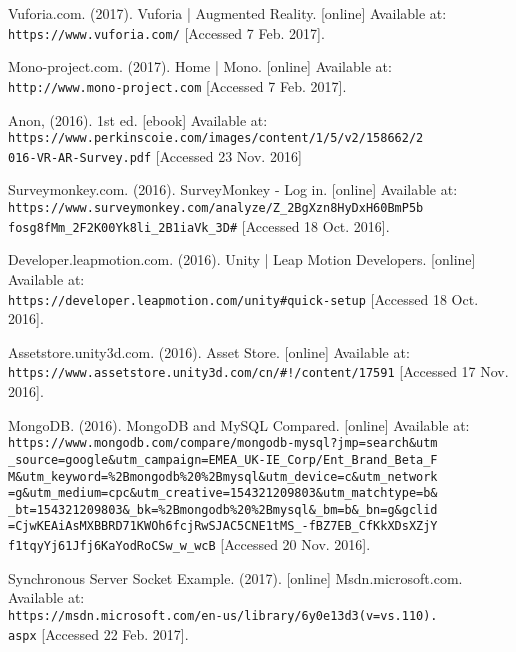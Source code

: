 \begin{thebibliography}{}
Vuforia.com. (2017). Vuforia | Augmented Reality. [online] Available at: 
\\\texttt{https://www.vuforia.com/} [Accessed 7 Feb. 2017].

Mono-project.com. (2017). Home | Mono. [online] Available at:
\\\texttt{http://www.mono-project.com} [Accessed 7 Feb. 2017].


Anon, (2016). 1st ed. [ebook] Available at:
\\\texttt{https://www.perkinscoie.com/images/content/1/5/v2/158662/2\\016-VR-AR-Survey.pdf}
[Accessed 23 Nov. 2016]

Surveymonkey.com. (2016). SurveyMonkey - Log in. [online] Available at:
\\\texttt{https://www.surveymonkey.com/analyze/Z\_2BgXzn8HyDxH60BmP5b\\fosg8fMm\_2F2K00Yk8li\_2B1iaVk\_3D\#}
[Accessed 18 Oct. 2016].

Developer.leapmotion.com. (2016). Unity | Leap Motion Developers. [online] Available at:
\\\texttt{https://developer.leapmotion.com/unity\#quick-setup}
[Accessed 18 Oct. 2016].

Assetstore.unity3d.com. (2016). Asset Store. [online] Available at:
\\\texttt{https://www.assetstore.unity3d.com/cn/\#!/content/17591}
[Accessed 17 Nov. 2016].

MongoDB. (2016). MongoDB and MySQL Compared. [online] Available at:
\\\texttt{https://www.mongodb.com/compare/mongodb-mysql?jmp=search\&utm\\\_source=google\&utm\_campaign=EMEA\_UK-IE\_Corp/Ent\_Brand\_Beta\_F\\M\&utm\_keyword=\%2Bmongodb\%20\%2Bmysql\&utm\_device=c\&utm\_network\\=g\&utm\_medium=cpc\&utm\_creative=154321209803\&utm\_matchtype=b\&\\\_bt=154321209803\&\_bk=\%2Bmongodb\%20\%2Bmysql\&\_bm=b\&\_bn=g\&gclid\\=CjwKEAiAsMXBBRD71KWOh6fcjRwSJAC5CNE1tMS\_-fBZ7EB\_CfKkXDsXZjY\\f1tqyYj61Jfj6KaYodRoCSw\_w\_wcB}  
[Accessed 20 Nov. 2016].


Synchronous Server Socket Example. (2017). [online] Msdn.microsoft.com. Available at: 
\\\texttt{https://msdn.microsoft.com/en-us/library/6y0e13d3(v=vs.110).\\aspx} [Accessed 22 Feb. 2017].


\end{thebibliography}

